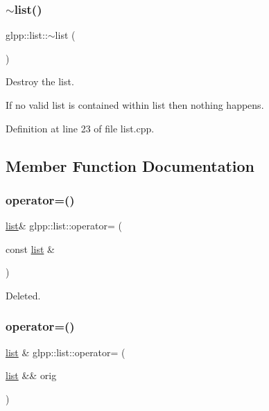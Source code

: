 \mbox{\label{classglpp_1_1list_acae5cc28ee69a9cc37c6b812d60d09b2}} 
\subsubsection{\texorpdfstring{$\sim$list()}{~list()}}
{\footnotesize\ttfamily glpp\+::list\+::$\sim$list (\begin{DoxyParamCaption}{ }\end{DoxyParamCaption})\hspace{0.3cm}{\ttfamily [noexcept]}}



Destroy the list. 

If no valid list is contained within list then nothing happens. 

Definition at line 23 of file list.\+cpp.



\subsection{Member Function Documentation}
\mbox{\label{classglpp_1_1list_a2ae6b7f26d0fad6c358770fc7dd64389}} 
\subsubsection{\texorpdfstring{operator=()}{operator=()}\hspace{0.1cm}{\footnotesize\ttfamily [1/2]}}
{\footnotesize\ttfamily \hyperlink{classglpp_1_1list}{list}\& glpp\+::list\+::operator= (\begin{DoxyParamCaption}\item[{const \hyperlink{classglpp_1_1list}{list} \&}]{ }\end{DoxyParamCaption})\hspace{0.3cm}{\ttfamily [delete]}}

Deleted. \mbox{\label{classglpp_1_1list_a74fbee0338eac4b1df84aedcefb0fc4d}} 
\subsubsection{\texorpdfstring{operator=()}{operator=()}\hspace{0.1cm}{\footnotesize\ttfamily [2/2]}}
{\footnotesize\ttfamily \hyperlink{classglpp_1_1list}{list} \& glpp\+::list\+::operator= (\begin{DoxyParamCaption}\item[{\hyperlink{classglpp_1_1list}{list} \&\&}]{orig }\end{DoxyParamCaption})\hspace{0.3cm}{\ttfamily [noexcept]}}



